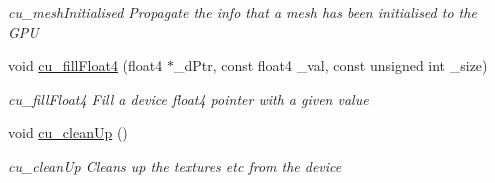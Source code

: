 \begin{DoxyCompactItemize}
\begin{DoxyCompactList}\small\item\em cu\-\_\-mesh\-Initialised Propagate the info that a mesh has been initialised to the G\-P\-U \end{DoxyCompactList}\item 
void \hyperlink{PathTracer_8cu_a7cfaf8db845b7c5c5af7361d54a10ca0}{cu\-\_\-fill\-Float4} (float4 $\ast$\-\_\-d\-Ptr, const float4 \-\_\-val, const unsigned int \-\_\-size)
\begin{DoxyCompactList}\small\item\em cu\-\_\-fill\-Float4 Fill a device float4 pointer with a given value \end{DoxyCompactList}\item 
\hypertarget{PathTracer_8cu_a6a3d532cae6d73f9efe5bf195eb14d1e}{void \hyperlink{PathTracer_8cu_a6a3d532cae6d73f9efe5bf195eb14d1e}{cu\-\_\-clean\-Up} ()}\label{PathTracer_8cu_a6a3d532cae6d73f9efe5bf195eb14d1e}

\begin{DoxyCompactList}\small\item\em cu\-\_\-clean\-Up Cleans up the textures etc from the device \end{DoxyCompactList}\end{DoxyCompactItemize}
